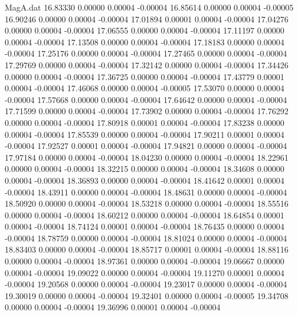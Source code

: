 \begin{filecontents}{MagA.dat}
  16.83330    0.00000    0.00004   -0.00004
  16.85614    0.00000    0.00004   -0.00005
  16.90246    0.00000    0.00004   -0.00004
  17.01894    0.00001    0.00004   -0.00004
  17.04276    0.00000    0.00004   -0.00004
  17.06555    0.00000    0.00004   -0.00004
  17.11197    0.00000    0.00004   -0.00004
  17.13508    0.00000    0.00004   -0.00004
  17.18183    0.00000    0.00004   -0.00004
  17.25176    0.00000    0.00004   -0.00004
  17.27465    0.00000    0.00004   -0.00004
  17.29769    0.00000    0.00004   -0.00004
  17.32142    0.00000    0.00004   -0.00004
  17.34426    0.00000    0.00004   -0.00004
  17.36725    0.00000    0.00004   -0.00004
  17.43779    0.00001    0.00004   -0.00004
  17.46068    0.00000    0.00004   -0.00005
  17.53070    0.00000    0.00004   -0.00004
  17.57668    0.00000    0.00004   -0.00004
  17.64642    0.00000    0.00004   -0.00004
  17.71599    0.00000    0.00004   -0.00004
  17.73902    0.00000    0.00004   -0.00004
  17.76292    0.00000    0.00004   -0.00004
  17.80918    0.00001    0.00004   -0.00004
  17.83238    0.00000    0.00004   -0.00004
  17.85539    0.00000    0.00004   -0.00004
  17.90211    0.00001    0.00004   -0.00004
  17.92527    0.00001    0.00004   -0.00004
  17.94821    0.00000    0.00004   -0.00004
  17.97184    0.00000    0.00004   -0.00004
  18.04230    0.00000    0.00004   -0.00004
  18.22961    0.00000    0.00004   -0.00004
  18.32215    0.00000    0.00004   -0.00004
  18.34608    0.00000    0.00004   -0.00004
  18.36893    0.00000    0.00004   -0.00004
  18.41642    0.00001    0.00004   -0.00004
  18.43911    0.00000    0.00004   -0.00004
  18.48631    0.00000    0.00004   -0.00004
  18.50920    0.00000    0.00004   -0.00004
  18.53218    0.00000    0.00004   -0.00004
  18.55516    0.00000    0.00004   -0.00004
  18.60212    0.00000    0.00004   -0.00004
  18.64854    0.00001    0.00004   -0.00004
  18.74124    0.00001    0.00004   -0.00004
  18.76435    0.00000    0.00004   -0.00004
  18.78759    0.00000    0.00004   -0.00004
  18.81024    0.00000    0.00004   -0.00004
  18.83403    0.00000    0.00004   -0.00004
  18.85717    0.00001    0.00004   -0.00004
  18.88116    0.00000    0.00004   -0.00004
  18.97361    0.00000    0.00004   -0.00004
  19.06667    0.00000    0.00004   -0.00004
  19.09022    0.00000    0.00004   -0.00004
  19.11270    0.00001    0.00004   -0.00004
  19.20568    0.00000    0.00004   -0.00004
  19.23017    0.00000    0.00004   -0.00004
  19.30019    0.00000    0.00004   -0.00004
  19.32401    0.00000    0.00004   -0.00005
  19.34708    0.00000    0.00004   -0.00004
  19.36996    0.00001    0.00004   -0.00004

\end{filecontents}
